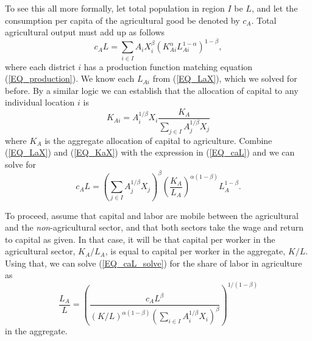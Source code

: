 \documentclass[11pt]{article}
\begin{document}
To see this all more formally, let total population in region $I$ be $L$, and let the consumption per capita of the agricultural good be denoted by $c_A$. Total agricultural output must add up as follows
\begin{equation}
c_A L = \sum_{i \in I} A_{i} X_{i}^{\beta} \left(K_{Ai}^{\alpha}L_{Ai}^{1-\alpha}\right)^{1-\beta}, \label{EQ_caL}
\end{equation}
where each district $i$ has a production function matching equation (\ref{EQ_production}). We know each $L_{Ai}$ from (\ref{EQ_LaX}), which we solved for before. By a similar logic we can establish that the allocation of capital to any individual location $i$ is
\begin{equation}
	K_{Ai} = A_{i}^{1/\beta} X_i \frac{K_A}{\sum_{j\in I} A_{j}^{1/\beta}X_{j}} \label{EQ_KaX}
\end{equation}
where $K_A$ is the aggregate allocation of capital to agriculture. Combine (\ref{EQ_LaX}) and (\ref{EQ_KaX}) with the expression in (\ref{EQ_caL}) and we can solve for 
\begin{equation}
	c_A L = \left(\sum_{j\in I} A_{j}^{1/\beta}X_{j} \right)^\beta \left(\frac{K_A}{L_A}\right)^{\alpha(1-\beta)} L_A^{1-\beta}. \label{EQ_caL_solve}
\end{equation}

To proceed, assume that capital and labor are mobile between the agricultural and the \textit{non}-agricultural sector, and that both sectors take the wage and return to capital as given. In that case, it will be that capital per worker in the agricultural sector, $K_A/L_A$, is equal to capital per worker in the aggregate, $K/L$. Using that, we can solve (\ref{EQ_caL_solve}) for the share of labor in agriculture as
\begin{equation}
\frac{L_{A}}{L} = \left(\frac{c_A L^{\beta}}{(K/L)^{\alpha(1-\beta)} \left(\sum_{i \in I} A_i^{1/\beta} X_i\right)^{\beta}} \right)^{1/(1-\beta)} \label{EQ_LaL}
\end{equation}
in the aggregate. 
\end{document}
